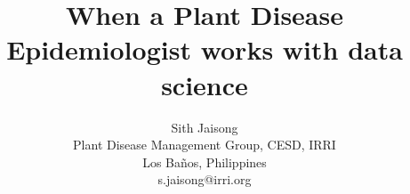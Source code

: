 \documentclass[12pt,a4paper]{article}
\begin{document}
\thispagestyle{empty}

\title{\textbf{When a Plant Disease Epidemiologist works with data science}}
\author{Sith Jaisong \\
Plant Disease Management Group, CESD, IRRI\\ Los Ba\~{n}os, Philippines\\
s.jaisong@irri.org}
\date{} %
\maketitle\thispagestyle{empty} %


%
%
%
%
%
%
\end{document}
